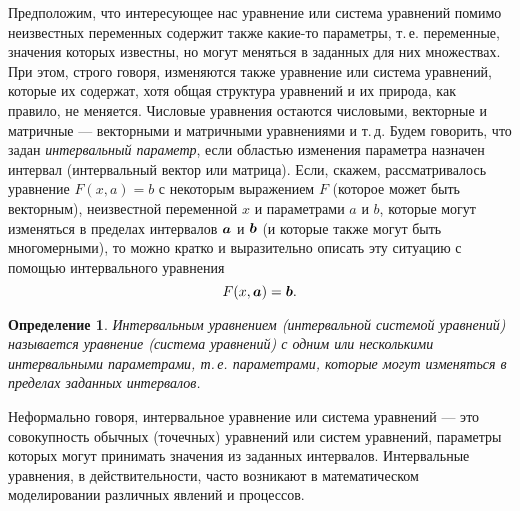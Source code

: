 \documentclass[a5paper,openany]{book}
\newcommand{\mbf}[1]{\protect\text{\boldmath$#1$}}
\newtheorem{definition}{Определение}[section]
\begin{document}
Предположим, что интересующее нас уравнение или система уравнений помимо неизвестных 
переменных содержит также какие-то параметры, т.\,е. переменные, значения которых 
известны, но могут меняться в заданных для них множествах. При этом, строго говоря, 
изменяются также уравнение или система уравнений, которые их содержат, хотя общая 
структура уравнений и их природа, как правило, не меняется. Числовые уравнения остаются 
числовыми, векторные и матричные --- векторными и матричными уравнениями и т.\,д. 
Будем говорить, что задан \emph{интервальный параметр}, 
если областью изменения параметра назначен интервал (интервальный вектор или матрица). 
Если, скажем, рассматривалось уравнение $F(x, a) = b$ с некоторым выражением $F$ 
(которое может быть векторным), неизвестной переменной $x$ и параметрами $a$ и $b$, 
которые могут изменяться в пределах интервалов $\mbf{a}$ и $\mbf{b}$ (и которые также 
могут быть многомерными), то можно кратко и выразительно описать эту ситуацию 
с помощью интервального уравнения 
\begin{equation} 
\label{IntervalEqn} 
F(x, \mbf{a}) = \mbf{b}. 
\end{equation}
   
\begin{definition} 
\textsl{Интервальным уравнением} (интервальной системой уравнений) называется 
уравнение (система уравнений) с одним или несколькими интервальными параметрами, 
т.\,е. параметрами, которые могут изменяться в пределах заданных интервалов.%
% 
\end{definition} 
   
Неформально говоря, интервальное уравнение или система уравнений --- это совокупность 
обычных (точечных) уравнений или систем уравнений, параметры которых могут принимать 
значения из заданных интервалов. Интервальные уравнения, в действительности, часто 
возникают в математическом моделировании различных явлений и процессов. 
   
\end{document}
